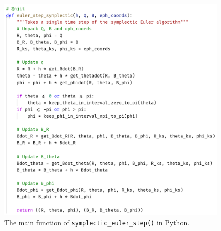 \begin{figure}[H]
    \centering
    \includegraphics[width=0.90\linewidth]{fig/unit-testing-sympletic-euler-step-python-1.png}
    \caption{The main function of \texttt{symplectic\_euler\_step()} in Python.}
    \label{fig:unit-testing-sympletic-euler-step-python-1}
\end{figure}

